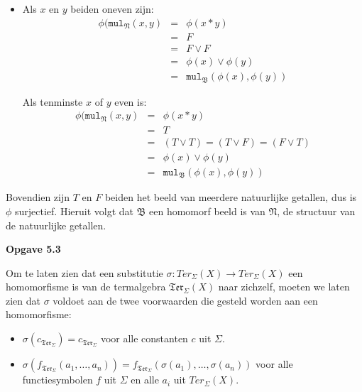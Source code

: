 \documentclass[a4paper,11pt]{article}
\begin{document}
\begin{enumerate}
\begin{itemize}
\item
Als $x$ en $y$ beiden oneven zijn:
\begin{eqnarray*}
\phi(\texttt{mul}_{\mathfrak{N}}(x,y) & = & \phi(x*y) \\
                                      & = & F \\
                                      & = & F \vee F \\
                                      & = & \phi(x) \vee \phi(y) \\
                                      & = & \texttt{mul}_{\mathfrak{B}}(\phi(x),\phi(y))
\end{eqnarray*}

Als tenminste $x$ of $y$ even is:
\begin{eqnarray*}
\phi(\texttt{mul}_{\mathfrak{N}}(x,y) & = & \phi(x*y) \\
                                      & = & T \\
                                      & = & (T \vee T) = (T \vee F) = (F \vee T) \\
                                      & = & \phi(x) \vee \phi(y) \\
                                      & = & \texttt{mul}_{\mathfrak{B}}(\phi(x),\phi(y))
\end{eqnarray*}

\end{itemize}

Bovendien zijn $T$ en $F$ beiden het beeld van meerdere natuurlijke getallen,
dus is $\phi$ surjectief. Hieruit volgt dat $\mathfrak{B}$ een homomorf beeld
is van $\mathfrak{N}$, de structuur van de natuurlijke getallen.\\[2em]

\end{enumerate}


{\bf Opgave 5.3}

Om te laten zien dat een substitutie $\sigma : Ter_{\Sigma}(X) \rightarrow
Ter_{\Sigma}(X)$ een homomorfisme is van de termalgebra
$\mathfrak{Ter}_{\Sigma}(X)$ naar zichzelf, moeten we laten zien dat $\sigma$
voldoet aan de twee voorwaarden die gesteld worden aan een homomorfisme:

\begin{itemize}

\item
$\sigma(c_{\mathfrak{Ter}_{\Sigma}}) = c_{\mathfrak{Ter}_{\Sigma}}$ voor alle
  constanten $c$ uit $\Sigma$.

\item
$\sigma(f_{\mathfrak{Ter}_{\Sigma}}(a_{1}, \ldots, a_{n}))
= f_{\mathfrak{Ter}_{\Sigma}}(\sigma(a_{1}), \ldots, \sigma(a_{n}))$ voor alle
functiesymbolen $f$ uit $\Sigma$ en alle $a_{i}$ uit $Ter_{\Sigma}(X)$.

\end{itemize}
\end{document}
